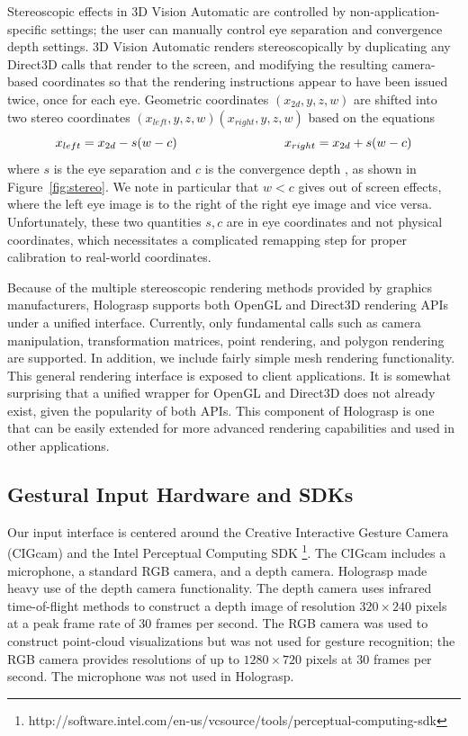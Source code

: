 \documentclass[pageno]{jpaper}
\begin{document}
Stereoscopic effects in 3D Vision Automatic are controlled by non-application-specific settings; the user can manually control
eye separation and convergence depth settings.
3D Vision Automatic renders stereoscopically by duplicating any Direct3D calls that render to the screen, and modifying the 
resulting camera-based coordinates so that the rendering instructions appear to have been issued twice, once for each eye. Geometric
coordinates $(x_{2d}, y, z, w)$ are shifted into two stereo coordinates $(x_{left}, y, z, w)(x_{right}, y, z, w)$ based on the equations
$$x_{left} = x_{2d} - s(w - c) \hspace{30mm}
x_{right} = x_{2d} + s(w - c)$$
where $s$ is the eye separation and $c$ is the convergence depth \cite{nvidia3dvision}, as shown in Figure~\ref{fig:stereo}. We note in particular that $w<c$ gives out of screen effects, where
the left eye image is to the right of the right eye image and vice versa. Unfortunately, these two quantities $s, c$ are in eye coordinates and not
physical coordinates, which necessitates a complicated remapping step for proper calibration to real-world coordinates.

Because of the multiple stereoscopic rendering methods provided by graphics manufacturers, Holograsp supports both OpenGL and Direct3D rendering APIs under a unified interface.
Currently, only fundamental calls such as camera manipulation, transformation matrices, point rendering, and polygon rendering are supported. In addition,
we include fairly simple mesh rendering functionality. This general rendering interface is exposed to client applications. It is somewhat surprising that
a unified wrapper for OpenGL and Direct3D does not already exist, given the popularity of both APIs. This component of Holograsp is one that can be easily extended for
more advanced rendering capabilities and used in other applications.

\subsection{Gestural Input Hardware and SDKs}
Our input interface is centered around the Creative Interactive Gesture Camera (CIGcam) and the Intel Perceptual Computing SDK
\footnote{http://software.intel.com/en-us/vcsource/tools/perceptual-computing-sdk}.
The CIGcam includes a microphone, a standard RGB camera, and a depth camera. Holograsp made heavy use of the depth camera functionality.
The depth camera uses infrared time-of-flight methods to construct a depth image of resolution $320 \times 240$ pixels at a peak frame
rate of 30 frames per second. The RGB camera was used to construct point-cloud visualizations but was not used for gesture recognition;
the RGB camera provides resolutions of up to $1280 \times 720$ pixels at 30 frames per second. The microphone was not used in Holograsp.
\end{document}
